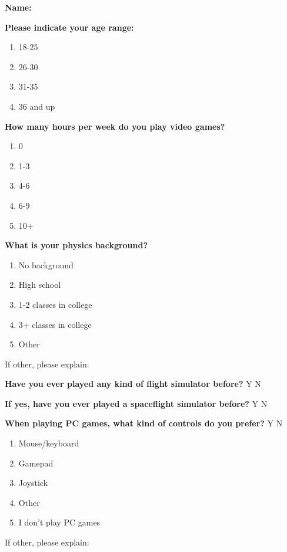 \vspace{5mm}
\noindent\textbf{Name:}

\vspace{5mm}
\noindent\textbf{Please indicate your age range:}
\begin{enumerate}
  \item 18-25
  \item 26-30
  \item 31-35
  \item 36 and up
\end{enumerate}

\vspace{5mm}
\noindent\textbf{How many hours per week do you play video games?}
\begin{enumerate}
  \item 0
  \item 1-3
  \item 4-6
  \item 6-9
  \item 10+
\end{enumerate}

\vspace{5mm}
\noindent\textbf{What is your physics background?}
\begin{enumerate}
  \item No background
  \item High school
  \item 1-2 classes in college
  \item 3+ classes in college
  \item Other
\end{enumerate}
If other, please explain:

\vspace{5mm}
\noindent\textbf{Have you ever played any kind of flight simulator before?} Y N

\vspace{5mm}
\noindent\textbf{If yes, have you ever played a spaceflight simulator before?} Y N

\vspace{5mm}
\noindent\textbf{When playing PC games, what kind of controls do you prefer?} Y N
\begin{enumerate}
  \item Mouse/keyboard
  \item Gamepad
  \item Joystick
  \item Other
  \item I don’t play PC games
\end{enumerate}
If other, please explain:


